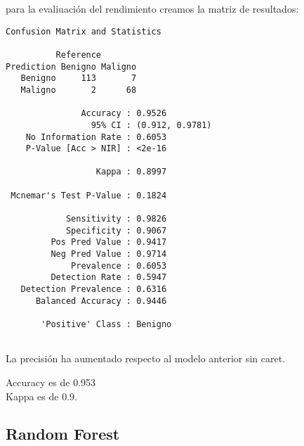 \documentclass[
]{article}
\newenvironment{Shaded}{\begin{snugshade}}{\end{snugshade}}
\newcommand{\CommentTok}[1]{\textcolor[rgb]{0.56,0.35,0.01}{\textit{#1}}}
\newcommand{\DataTypeTok}[1]{\textcolor[rgb]{0.13,0.29,0.53}{#1}}
\newcommand{\FloatTok}[1]{\textcolor[rgb]{0.00,0.00,0.81}{#1}}
\newcommand{\KeywordTok}[1]{\textcolor[rgb]{0.13,0.29,0.53}{\textbf{#1}}}
\newcommand{\NormalTok}[1]{#1}
\newcommand{\OperatorTok}[1]{\textcolor[rgb]{0.81,0.36,0.00}{\textbf{#1}}}
\newcommand{\StringTok}[1]{\textcolor[rgb]{0.31,0.60,0.02}{#1}}
\begin{document}
para la evaliuación del rendimiento creamos la matriz de resultados:

\begin{Shaded}
\end{Shaded}

\begin{verbatim}
Confusion Matrix and Statistics

          Reference
Prediction Benigno Maligno
   Benigno     113       7
   Maligno       2      68
                                         
               Accuracy : 0.9526         
                 95% CI : (0.912, 0.9781)
    No Information Rate : 0.6053         
    P-Value [Acc > NIR] : <2e-16         
                                         
                  Kappa : 0.8997         
                                         
 Mcnemar's Test P-Value : 0.1824         
                                         
            Sensitivity : 0.9826         
            Specificity : 0.9067         
         Pos Pred Value : 0.9417         
         Neg Pred Value : 0.9714         
             Prevalence : 0.6053         
         Detection Rate : 0.5947         
   Detection Prevalence : 0.6316         
      Balanced Accuracy : 0.9446         
                                         
       'Positive' Class : Benigno        
                                         
\end{verbatim}

La precisión ha aumentado respecto al modelo anterior sin caret.

Accuracy es de 0.953\\
Kappa es de 0.9.

\hypertarget{random-forest}{%
\subsection{Random Forest}\label{random-forest}}
\end{document}
